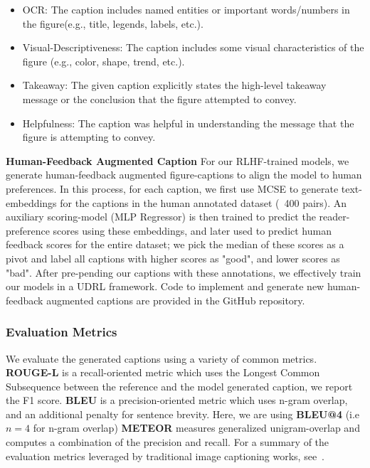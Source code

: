 \documentclass[11pt]{article}
\renewcommand{\cite}[1]{\citep{#1}}
\begin{document}
\begin{itemize}
    \item OCR: The caption includes named entities or important words/numbers in the figure(e.g., title, legends, labels, etc.).
    \item Visual-Descriptiveness: The caption includes some visual characteristics of the figure (e.g., color, shape, trend, etc.). 
    \item Takeaway: The given caption explicitly states the high-level takeaway message or the conclusion that the figure attempted to convey. 
    \item Helpfulness: The caption was helpful in understanding the message that the figure is attempting to convey.
\end{itemize}

\textbf{Human-Feedback Augmented Caption}
For our RLHF-trained models, we generate human-feedback augmented figure-captions to align the model to human preferences. 
In this process, for each caption, we first use MCSE \cite{zhang2022mcse} to generate text-embeddings for the captions in the human annotated dataset (~400 pairs). An auxiliary scoring-model (MLP Regressor) is then trained to predict the reader-preference scores using these embeddings, and later used to predict human feedback scores for the entire dataset; we pick the median of these scores as a pivot and label all captions with higher scores as "good", and lower scores as "bad". After pre-pending our captions with these annotations, we effectively train our models in a UDRL framework. Code to implement and generate new human-feedback augmented captions are provided in the GitHub repository. 

\subsubsection{Evaluation Metrics}
We evaluate the generated captions using a variety of common metrics. 
\textbf{ROUGE-L} \cite{lin-2004-rouge} is a recall-oriented metric which uses the Longest Common Subsequence between the reference and the model generated caption, we report the F1 score. 
\textbf{BLEU}\cite{papineni2002bleu} is a precision-oriented metric which uses n-gram overlap, and an additional penalty for sentence brevity. Here, we are using \textbf{BLEU@4} (i.e $n = 4$ for n-gram overlap)
\textbf{METEOR}\cite{banerjee2005meteor} measures generalized unigram-overlap and computes a combination of the precision and recall. 
For a summary of the evaluation metrics leveraged by traditional image captioning works, see~\cite{stefanini2022show}.
\end{document}
